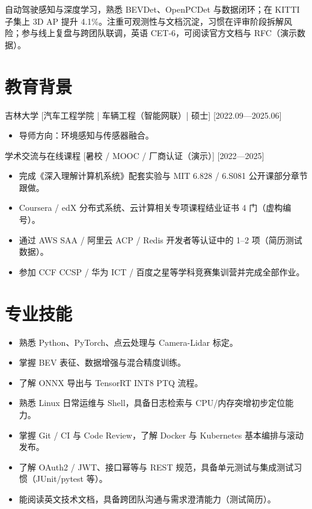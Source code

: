 \documentclass{resume-photo}
\begin{document}

\ResumeTitle

\noindent 自动驾驶感知与深度学习，熟悉 BEVDet、OpenPCDet 与数据闭环；在 KITTI 子集上 3D AP 提升 4.1\%。注重可观测性与文档沉淀，习惯在评审阶段拆解风险；参与线上复盘与跨团队联调，英语 CET-6，可阅读官方文档与 RFC（演示数据）。

\section{教育背景}
\ResumeItem
{吉林大学}
[\textnormal{汽车工程学院 | 车辆工程（智能网联）| 硕士}]
[2022.09—2025.06]

\begin{itemize}
  \item 导师方向：环境感知与传感器融合。
\end{itemize}


\ResumeItem
{学术交流与在线课程}
[\textnormal{暑校 / MOOC / 厂商认证（演示）}]
[2022—2025]

\begin{itemize}
  \item 完成《深入理解计算机系统》配套实验与 MIT 6.828 / 6.S081 公开课部分章节跟做。
  \item Coursera / edX 分布式系统、云计算相关专项课程结业证书 4 门（虚构编号）。
  \item 通过 AWS SAA / 阿里云 ACP / Redis 开发者等认证中的 1--2 项（简历测试数据）。
  \item 参加 CCF CCSP / 华为 ICT / 百度之星等学科竞赛集训营并完成全部作业。
\end{itemize}



\section{专业技能}
\begin{itemize}
  \item 熟悉 Python、PyTorch、点云处理与 Camera-Lidar 标定。
  \item 掌握 BEV 表征、数据增强与混合精度训练。
  \item 了解 ONNX 导出与 TensorRT INT8 PTQ 流程。
  \item 熟悉 Linux 日常运维与 Shell，具备日志检索与 CPU/内存突增初步定位能力。
  \item 掌握 Git / CI 与 Code Review，了解 Docker 与 Kubernetes 基本编排与滚动发布。
  \item 了解 OAuth2 / JWT、接口幂等与 REST 规范，具备单元测试与集成测试习惯（JUnit/pytest 等）。
  \item 能阅读英文技术文档，具备跨团队沟通与需求澄清能力（测试简历）。
\end{itemize}
\end{document}

